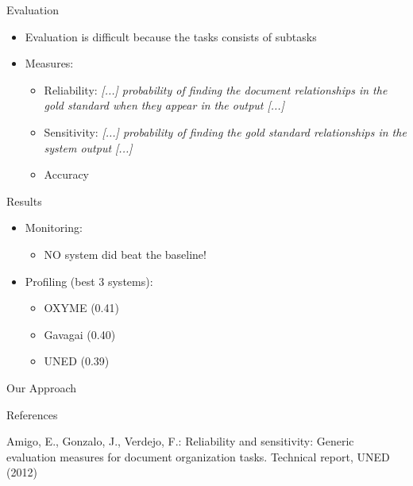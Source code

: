 \documentclass[12pt,a4paper]{beamer}
\begin{document}
\begin{frame}{Evaluation}
\begin{itemize}
\item Evaluation is difficult because the tasks consists of subtasks
\item Measures:
\begin{itemize}
\item Reliability: \textit{[...] probability of finding the document relationships in the gold standard when they appear in the output [...]} \cite{amigo}
\item Sensitivity: \textit{[...] probability of finding the gold standard relationships in the system output [...]} \cite{amigo}
\item Accuracy
\end{itemize}
\end{itemize}
\end{frame}


\begin{frame}{Results}
\begin{itemize}
\item Monitoring:
\begin{itemize}
\item NO system did beat the baseline!
\end{itemize}
\item Profiling (best 3 systems):
\begin{itemize}
\item OXYME (0.41)
\item Gavagai (0.40)
\item UNED (0.39)
\end{itemize}
\end{itemize}
\end{frame}

\begin{frame}{Our Approach}

\end{frame}


\begin{frame}{References}
\begin{thebibliography}{-}
 Amigo, E., Gonzalo, J., Verdejo, F.: Reliability and sensitivity: Generic evaluation
measures for document organization tasks. Technical report, UNED (2012)

\end{thebibliography}
\end{frame}
\end{document}
